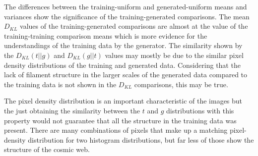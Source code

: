 \documentclass[twocolumn]{article}
\numberwithin{equation}{section}
\begin{document}
The differences between the training-uniform and generated-uniform means and variances show the significance of the 
training-generated comparisons. The mean $D_{KL}$ values of the training-generated comparisons are almost at the value of 
the training-training comparison means which is more evidence for the understandings of the training data by the generator. 
The similarity shown by the $D_{KL}(t||g)$ and $D_{KL}(g||t)$ values may mostly be due to the similar pixel density 
distributions of the training and generated data. Considering that the lack of filament structure in the larger scales 
of the generated data compared to the training data is not shown in the $D_{KL}$ comparisons, this may be true. 

The pixel density distribution is an important characteristic of the images but the just obtaining the 
similarity between the $t$ and $g$ distributions with this property would not guarantee that all the structure in the 
training data was present. There are many combinations of pixels that make up a matching pixel-density distribution for 
two histogram distributions, but far less of those show the structure of the cosmic web. 



\end{document}
